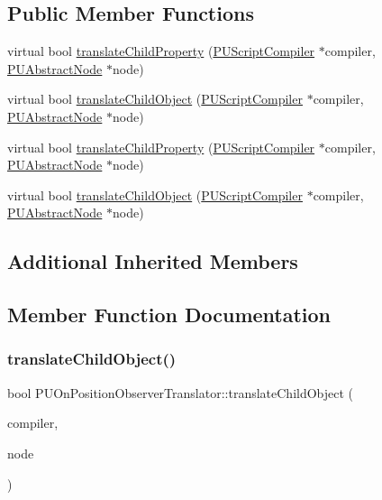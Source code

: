 \subsection*{Public Member Functions}
\begin{DoxyCompactItemize}
\item 
virtual bool \hyperlink{classPUOnPositionObserverTranslator_a994a0ec8a1b3a7f89b177822ee40390f}{translate\+Child\+Property} (\hyperlink{classPUScriptCompiler}{P\+U\+Script\+Compiler} $\ast$compiler, \hyperlink{classPUAbstractNode}{P\+U\+Abstract\+Node} $\ast$node)
\item 
virtual bool \hyperlink{classPUOnPositionObserverTranslator_a63bd03194019977ab97dd9c74d0206d1}{translate\+Child\+Object} (\hyperlink{classPUScriptCompiler}{P\+U\+Script\+Compiler} $\ast$compiler, \hyperlink{classPUAbstractNode}{P\+U\+Abstract\+Node} $\ast$node)
\item 
virtual bool \hyperlink{classPUOnPositionObserverTranslator_a0084342b8373c38a2161d4a14b7ea868}{translate\+Child\+Property} (\hyperlink{classPUScriptCompiler}{P\+U\+Script\+Compiler} $\ast$compiler, \hyperlink{classPUAbstractNode}{P\+U\+Abstract\+Node} $\ast$node)
\item 
virtual bool \hyperlink{classPUOnPositionObserverTranslator_a18b5d8181f44d69b275284fcce367e01}{translate\+Child\+Object} (\hyperlink{classPUScriptCompiler}{P\+U\+Script\+Compiler} $\ast$compiler, \hyperlink{classPUAbstractNode}{P\+U\+Abstract\+Node} $\ast$node)
\end{DoxyCompactItemize}
\subsection*{Additional Inherited Members}


\subsection{Member Function Documentation}
\mbox{\label{classPUOnPositionObserverTranslator_a63bd03194019977ab97dd9c74d0206d1}} 
\subsubsection{\texorpdfstring{translate\+Child\+Object()}{translateChildObject()}\hspace{0.1cm}{\footnotesize\ttfamily [1/2]}}
{\footnotesize\ttfamily bool P\+U\+On\+Position\+Observer\+Translator\+::translate\+Child\+Object (\begin{DoxyParamCaption}\item[{\hyperlink{classPUScriptCompiler}{P\+U\+Script\+Compiler} $\ast$}]{compiler,  }\item[{\hyperlink{classPUAbstractNode}{P\+U\+Abstract\+Node} $\ast$}]{node }\end{DoxyParamCaption})\hspace{0.3cm}{\ttfamily [virtual]}}

